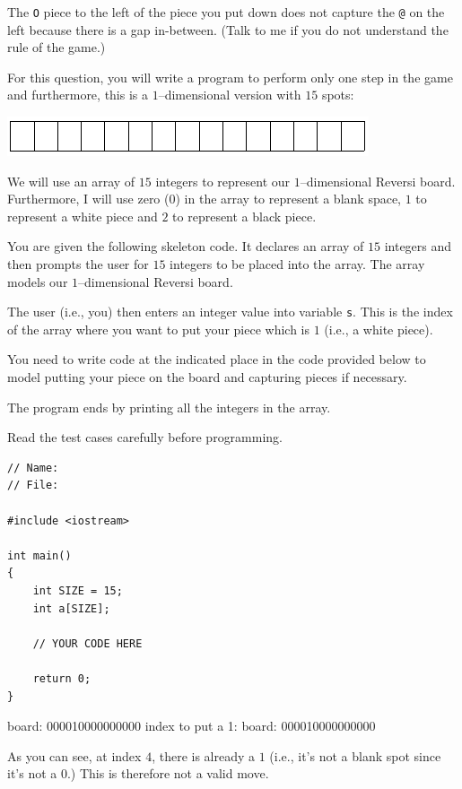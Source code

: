 The \verb!O! piece to the left of the piece you put down does not capture the
\verb!@! on the left because there is a gap in-between.
(Talk to me if you do not understand the rule of the game.)

For this question, you will write a program to perform only one step in the
game and furthermore, this is a $1$--dimensional version with $15$ spots:

\includegraphics[scale=0.5]{../a11/a11q04/question/pic8.png}

We will use an array of $15$ integers to represent our $1$--dimensional Reversi
board. Furthermore, I will use zero ($0$) in the array to represent a blank
space, $1$ to represent a white piece and $2$ to represent a black piece.

You are given the following skeleton code. It declares an array of $15$
integers and then prompts the user for $15$ integers to be placed into the
array. The array models our $1$--dimensional Reversi board.

The user (i.e., you) then enters an integer value into variable \verb!s!. This
is the index of the array where you want to put your piece which is $1$ (i.e.,
a white piece).

You need to write code at the indicated place in the code provided below to model
putting your piece on the board and capturing pieces if necessary.

The program ends by printing all the integers in the array.

Read the test cases carefully before programming.

\begin{Verbatim}[frame=single]
// Name:
// File:

#include <iostream>

int main()
{
    int SIZE = 15;
    int a[SIZE];

    // YOUR CODE HERE

    return 0;
}
\end{Verbatim}


\resett
\nextt
\begin{console}[frame=single, commandchars=\\\{\}]
board: 000010000000000
index to put a 1: 
board: 000010000000000
\end{console}
As you can see, at index $4$, there is already a $1$ (i.e., it's not a blank
spot since it's not a $0$.) This is therefore not a valid move.

